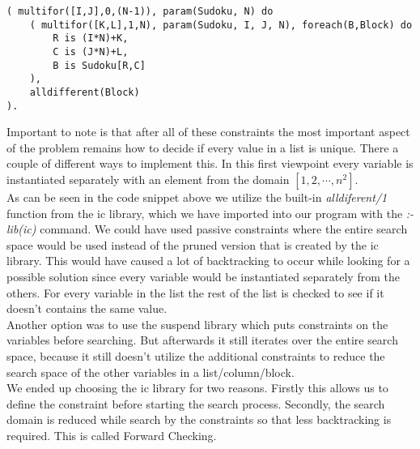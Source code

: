 \begin{lstlisting}
( multifor([I,J],0,(N-1)), param(Sudoku, N) do
	( multifor([K,L],1,N), param(Sudoku, I, J, N), foreach(B,Block) do
		R is (I*N)+K,
		C is (J*N)+L,
		B is Sudoku[R,C]
	),
	alldifferent(Block)
).
\end{lstlisting}

Important to note is that after all of these constraints the most important aspect of the problem remains how to decide if every value in a list is unique. 
There a couple of different ways to implement this.
In this first viewpoint every variable is instantiated separately with an element from the domain $[1,2,\cdots,n^{2}]$. \\

As can be seen in the code snippet above we utilize the built-in \textsl{alldiferent/1} function from the ic library, which we have imported into our program with the \textsl{:- lib(ic)} command.
We could have used passive constraints where the entire search space would be used instead of the pruned version that is created by the ic library.
This would have caused a lot of backtracking to occur while looking for a possible solution since every variable would be instantiated separately from the others.
For every variable in the list the rest of the list is checked to see if it doesn't contains the same value.\\

Another option was to use the suspend library which puts constraints on the variables before searching.
But afterwards it still iterates over the entire search space, because it still doesn't utilize the additional constraints to reduce the search space of the other variables in a list/column/block.\\
\newpage
We ended up choosing the ic library for two reasons.
Firstly this allows us to define the constraint before starting the search process.
Secondly, the search domain is reduced while search by the constraints so that less backtracking is required.
This is called Forward Checking. \\

